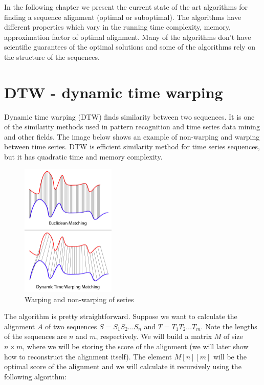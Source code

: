 In the following chapter we present the current state of the art algorithms for finding a sequence
alignment (optimal or suboptimal). The algorithms have different properties which vary in the
running time complexity, memory, approximation factor of optimal alignment. Many of the
algorithms don't have scientific guarantees of the optimal solutions and some of the algorithms rely
on the structure of the sequences.

\section{DTW - dynamic time warping}
\label{section:dtw}

Dynamic time warping (DTW) finds similarity between two sequences. It is one of the similarity
methods used in pattern recognition and time series data mining and other fields. The image below
shows an example of non-warping and warping between time series. DTW is efficient similarity method
for time series sequences, but it has quadratic time and memory complexity.

\begin{figure}[H]
  \centerline{\includegraphics[width=0.4\textwidth]{images/dtw}}
  \caption[DTW]{Warping and non-warping of series}
  \label{obr:dtw}
\end{figure}

The algorithm is pretty straightforward. Suppose we want to calculate the alignment $A$ of two
sequences $S = S_1S_2...S_n$ and $T = T_1T_2...T_m$. Note the lengths of the sequences are $n$ and
$m$, respectively. We will build a matrix $M$ of size $n \times m$, where we will be storing the
score of the alignment (we will later show how to reconstruct the alignment itself). The element
$M[n][m]$ will be the optimal score of the alignment and we will calculate it recursively using the
following algorithm:

